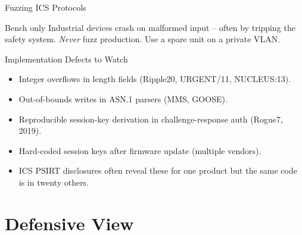 \documentclass[aspectratio=169,11pt]{beamer}
\begin{document}
\begin{frame}{Fuzzing ICS Protocols}
\centering
{}
\vspace{2mm}
\begin{warnbox}{Bench only}
Industrial devices crash on malformed input -- often by tripping the safety system. \emph{Never} fuzz production. Use a spare unit on a private VLAN.
\end{warnbox}
\end{frame}

\begin{frame}{Implementation Defects to Watch}
\begin{itemize}
  \item Integer overflows in length fields (Ripple20, URGENT/11, NUCLEUS:13).
  \item Out-of-bounds writes in ASN.1 parsers (MMS, GOOSE).
  \item Reproducible session-key derivation in challenge-response auth (Rogue7, 2019).
  \item Hard-coded session keys after firmware update (multiple vendors).
  \item ICS PSIRT disclosures often reveal these for one product but the same code is in twenty others.
\end{itemize}
\end{frame}

\section{Defensive View}
\end{document}

